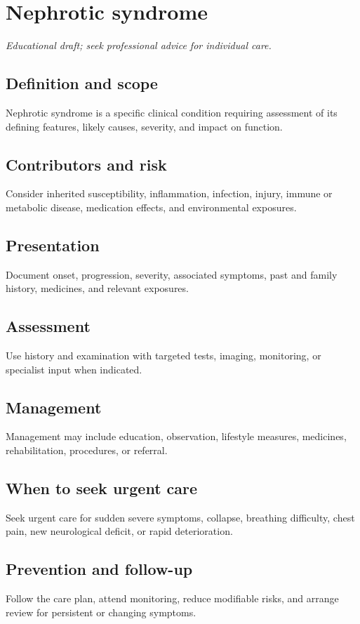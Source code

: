 \chapter{Nephrotic syndrome}

\medskip
\noindent\textit{Educational draft; seek professional advice for individual care.}

\section*{Definition and scope}
Nephrotic syndrome is a specific clinical condition requiring assessment of its defining features, likely causes, severity, and impact on function.

\section*{Contributors and risk}
Consider inherited susceptibility, inflammation, infection, injury, immune or metabolic disease, medication effects, and environmental exposures.

\section*{Presentation}
Document onset, progression, severity, associated symptoms, past and family history, medicines, and relevant exposures.

\section*{Assessment}
Use history and examination with targeted tests, imaging, monitoring, or specialist input when indicated.

\section*{Management}
Management may include education, observation, lifestyle measures, medicines, rehabilitation, procedures, or referral.

\section*{When to seek urgent care}
Seek urgent care for sudden severe symptoms, collapse, breathing difficulty, chest pain, new neurological deficit, or rapid deterioration.

\section*{Prevention and follow-up}
Follow the care plan, attend monitoring, reduce modifiable risks, and arrange review for persistent or changing symptoms.

